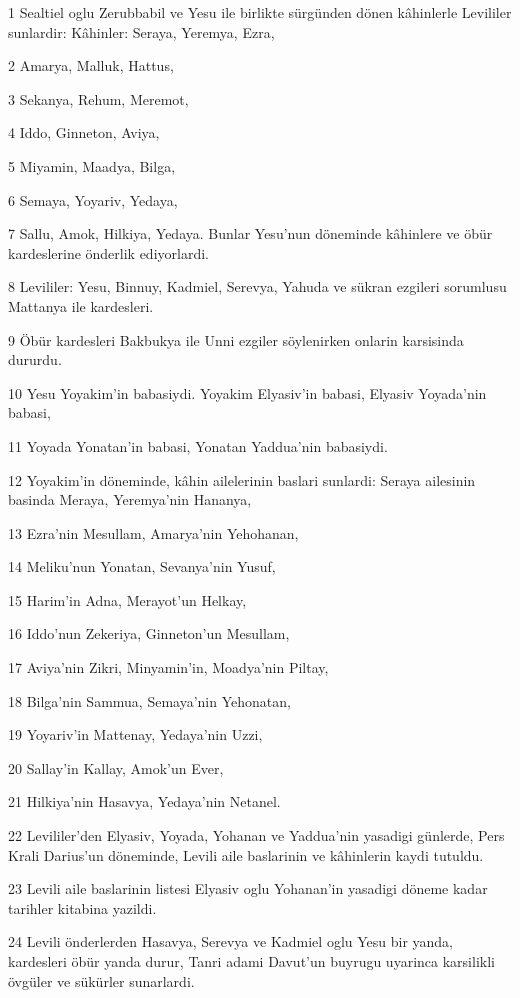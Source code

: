 \par 1 Sealtiel oglu Zerubbabil ve Yesu ile birlikte sürgünden dönen kâhinlerle Levililer sunlardir: Kâhinler: Seraya, Yeremya, Ezra,
\par 2 Amarya, Malluk, Hattus,
\par 3 Sekanya, Rehum, Meremot,
\par 4 Iddo, Ginneton, Aviya,
\par 5 Miyamin, Maadya, Bilga,
\par 6 Semaya, Yoyariv, Yedaya,
\par 7 Sallu, Amok, Hilkiya, Yedaya. Bunlar Yesu'nun döneminde kâhinlere ve öbür kardeslerine önderlik ediyorlardi.
\par 8 Levililer: Yesu, Binnuy, Kadmiel, Serevya, Yahuda ve sükran ezgileri sorumlusu Mattanya ile kardesleri.
\par 9 Öbür kardesleri Bakbukya ile Unni ezgiler söylenirken onlarin karsisinda dururdu.
\par 10 Yesu Yoyakim'in babasiydi. Yoyakim Elyasiv'in babasi, Elyasiv Yoyada'nin babasi,
\par 11 Yoyada Yonatan'in babasi, Yonatan Yaddua'nin babasiydi.
\par 12 Yoyakim'in döneminde, kâhin ailelerinin baslari sunlardi: Seraya ailesinin basinda Meraya, Yeremya'nin Hananya,
\par 13 Ezra'nin Mesullam, Amarya'nin Yehohanan,
\par 14 Meliku'nun Yonatan, Sevanya'nin Yusuf,
\par 15 Harim'in Adna, Merayot'un Helkay,
\par 16 Iddo'nun Zekeriya, Ginneton'un Mesullam,
\par 17 Aviya'nin Zikri, Minyamin'in, Moadya'nin Piltay,
\par 18 Bilga'nin Sammua, Semaya'nin Yehonatan,
\par 19 Yoyariv'in Mattenay, Yedaya'nin Uzzi,
\par 20 Sallay'in Kallay, Amok'un Ever,
\par 21 Hilkiya'nin Hasavya, Yedaya'nin Netanel.
\par 22 Levililer'den Elyasiv, Yoyada, Yohanan ve Yaddua'nin yasadigi günlerde, Pers Krali Darius'un döneminde, Levili aile baslarinin ve kâhinlerin kaydi tutuldu.
\par 23 Levili aile baslarinin listesi Elyasiv oglu Yohanan'in yasadigi döneme kadar tarihler kitabina yazildi.
\par 24 Levili önderlerden Hasavya, Serevya ve Kadmiel oglu Yesu bir yanda, kardesleri öbür yanda durur, Tanri adami Davut'un buyrugu uyarinca karsilikli övgüler ve sükürler sunarlardi.
